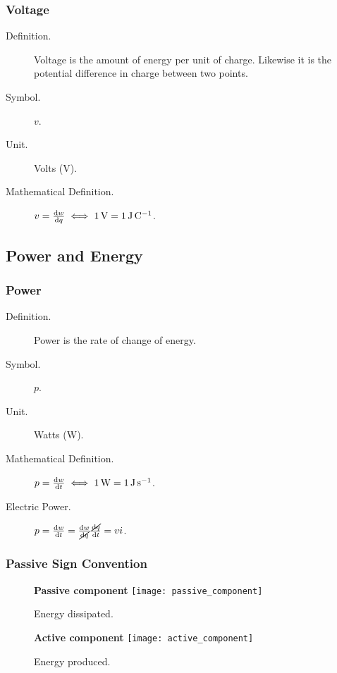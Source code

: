 \documentclass{article}
\begin{document}
\subsubsection{Voltage}
\begin{description}
    \item[Definition.] Voltage is the amount of energy per unit of charge. Likewise it is the potential difference in charge between two points.
    \item[Symbol.] $v$.
    \item[Unit.] Volts (\unit{\volt}).
    \item[Mathematical Definition.] $v=\dv{w}{q}\iff\SI{1}{\volt}=\SI{1}{\joule\per\coulomb}$. 
\end{description}
\subsection{Power and Energy}
\subsubsection{Power}
\begin{description}
    \item[Definition.] Power is the rate of change of energy.
    \item[Symbol.] $p$.
    \item[Unit.] Watts (\unit{\watt}).
    \item[Mathematical Definition.] $p=\dv{w}{t}\iff\SI{1}{\watt}=\SI{1}{\joule\per\s}$.
    \item[Electric Power.] $p=\dv{w}{t}=\frac{\dd{w}}{\cancel{\dd{q}}} \frac{\cancel{\dd{q}}}{\dd{t}}=vi$. 
\end{description}
\subsubsection{Passive Sign Convention}
\begin{figure}[H]
    \centering
    \begin{minipage}[H]{0.48\textwidth}
        \textbf{Passive component}
        \centering
        \texttt{[image: passive\_component]}
        \caption{Energy dissipated.}
    \end{minipage}\hfill
    \begin{minipage}[H]{0.48\textwidth}
        \textbf{Active component}
        \centering
        \texttt{[image: active\_component]}
        \caption{Energy produced.}
    \end{minipage}
\end{figure}
\end{document}
